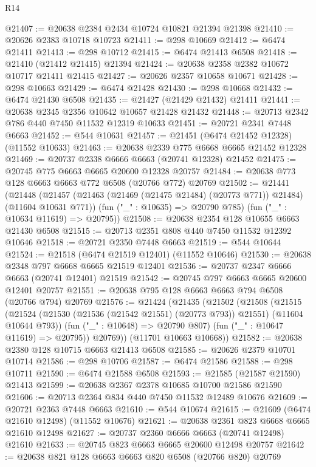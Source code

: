 \begin{lexlean}{R14}
\begin{coremodule}
{{{{{{{{{{{{{{{{{{{{{{{{{{{{{{{{{{{{{{{{{{{{{{{{{{{{{{{{{{{{{{{{{{{{{{{{{{{{{{{{{{@21407 := @20638 @2384 @2434 @10724 @10821 @21394 @21398
@21410 := @20626 @2383 @10718 @10723
@21411 := @298 @10669
@21412 := @6474 @21411
@21413 := @298 @10712
@21415 := @6474 @21413 @6508
@21418 := @21410 (@21412 @21415) @21394
@21424 := @20638 @2358 @2382 @10672 @10717 @21411 @21415
@21427 := @20626 @2357 @10658 @10671
@21428 := @298 @10663
@21429 := @6474 @21428
@21430 := @298 @10668
@21432 := @6474 @21430 @6508
@21435 := @21427 (@21429 @21432) @21411
@21441 := @20638 @2345 @2356 @10642 @10657 @21428 @21432
@21448 := @20713 @2342 @786 @440 @7450 @11532 @12319 @10633
@21451 := @20721 @2341 @7448 @6663
@21452 := @544 @10631
@21457 := @21451 (@6474 @21452 @12328) (@11552 @10633)
@21463 := @20638 @2339 @775 @6668 @6665 @21452 @12328
@21469 := @20737 @2338 @6666 @6663 (@20741 @12328) @21452
@21475 := @20745 @775 @6663 @6665 @20600 @12328 @20757
@21484 := @20638 @773 @128 @6663 @6663 @772 @6508 (@20766 @772) @20769
@21502 := @21441
    (@21448
      (@21457 (@21463 (@21469 (@21475 @21484) (@20773 @771)) @21484) (@11604 @10631 @771))
      (fun ("_" : @10635) => @20790 @785)
      (fun ("_" : @10634 @11619) => @20795))
@21508 := @20638 @2354 @128 @10655 @6663 @21430 @6508
@21515 := @20713 @2351 @808 @440 @7450 @11532 @12392 @10646
@21518 := @20721 @2350 @7448 @6663
@21519 := @544 @10644
@21524 := @21518 (@6474 @21519 @12401) (@11552 @10646)
@21530 := @20638 @2348 @797 @6668 @6665 @21519 @12401
@21536 := @20737 @2347 @6666 @6663 (@20741 @12401) @21519
@21542 := @20745 @797 @6663 @6665 @20600 @12401 @20757
@21551 := @20638 @795 @128 @6663 @6663 @794 @6508 (@20766 @794) @20769
@21576 := @21424
    (@21435
      (@21502
        (@21508
          (@21515
            (@21524 (@21530 (@21536 (@21542 @21551) (@20773 @793)) @21551) (@11604 @10644 @793))
            (fun ("_" : @10648) => @20790 @807)
            (fun ("_" : @10647 @11619) => @20795))
          @20769))
      (@11701 @10663 @10668))
@21582 := @20638 @2380 @128 @10715 @6663 @21413 @6508
@21585 := @20626 @2379 @10701 @10714
@21586 := @298 @10706
@21587 := @6474 @21586
@21588 := @298 @10711
@21590 := @6474 @21588 @6508
@21593 := @21585 (@21587 @21590) @21413
@21599 := @20638 @2367 @2378 @10685 @10700 @21586 @21590
@21606 := @20713 @2364 @834 @440 @7450 @11532 @12489 @10676
@21609 := @20721 @2363 @7448 @6663
@21610 := @544 @10674
@21615 := @21609 (@6474 @21610 @12498) (@11552 @10676)
@21621 := @20638 @2361 @823 @6668 @6665 @21610 @12498
@21627 := @20737 @2360 @6666 @6663 (@20741 @12498) @21610
@21633 := @20745 @823 @6663 @6665 @20600 @12498 @20757
@21642 := @20638 @821 @128 @6663 @6663 @820 @6508 (@20766 @820) @20769
}}}}}}}}}}}}}}}}}}}}}}}}}}}}}}}}}}}}}}}}}}}}}}}}}}}}}}}}}}}}}}}}}}}}}}}}}}}}}}}}}}
\end{coremodule}
\end{lexlean}
